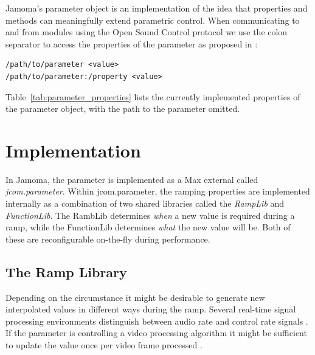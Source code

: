 \documentclass{article}
\begin{document}
Jamoma's parameter object is an implementation of the idea that properties and methods can meaningfully extend parametric control. When communicating to and from modules using the Open Sound Control protocol \cite{Wright:2003} we use the colon separator to access the properties of the parameter as proposed in \cite{Place:2008}:

\begin{small}
\begin{verbatim}
/path/to/parameter <value>
/path/to/parameter:/property <value>
\end{verbatim}
\end{small}

Table~\ref{tab:parameter_properties} lists the currently implemented properties of the parameter object, with the path to the parameter omitted.



\section{Implementation} %
\label{sec:param_implementation}

In Jamoma, the parameter is implemented as a Max external called \emph{jcom.parameter}. Within jcom.parameter, the ramping properties are implemented internally as a combination of two shared libraries called the \emph{RampLib} and \emph{FunctionLib}. The RambLib determines \emph{when} a new value is required during a ramp, while the FunctionLib determines \emph{what} the new value will be. Both of these are reconfigurable on-the-fly during performance.


\subsection{The Ramp Library} %
\label{ssec:ramplib}


Depending on the circumstance it might be desirable to generate new interpolated values in different ways during the ramp. Several real-time signal processing environments distinguish between audio rate and control rate signals \cite{Boulanger:2000csound, McCartney:1996supercollider}. If the parameter is controlling a video processing algorithm it might be sufficient to update the value once per video frame processed \cite{Jones:2005jitter}.
\end{document}
